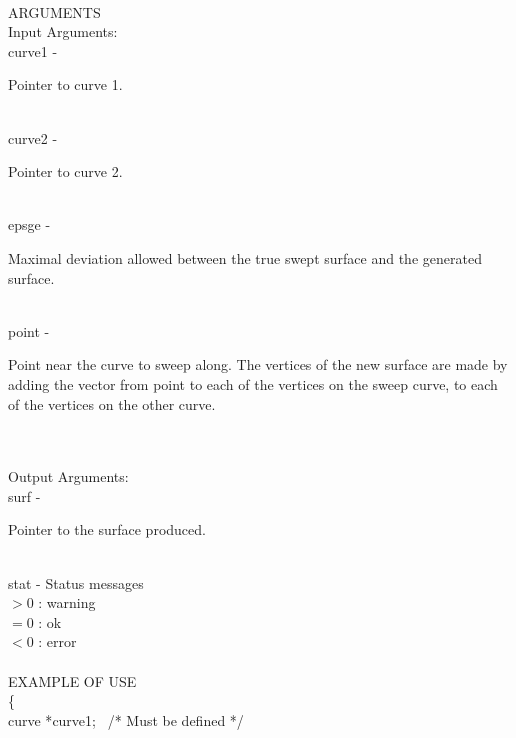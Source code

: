 \\
ARGUMENTS\\
        \>Input Arguments:\\
        \>\>    {\fov curve1}   \> - \> \begin{minipg2}
                                Pointer to curve 1.
                                \end{minipg2}\\
        \>\>    {\fov curve2}   \> - \> \begin{minipg2}
                                Pointer to curve 2.
                                \end{minipg2}\\
        \>\>    {\fov epsge}\> - \>     \begin{minipg2}
                                Maximal deviation allowed between the true swept
                                surface and the generated surface.
                                \end{minipg2}\\[0.3ex]
        \>\>    {\fov point}    \> - \> \begin{minipg2}
                Point near the curve to sweep along. The vertices of the new surface are made by adding the vector from point to each of the vertices on the sweep curve, to each of the vertices on the other curve.
                                \end{minipg2} \\[0.8ex]
\\
        \>Output Arguments:\\
        \>\>    {\fov surf}     \> - \> \begin{minipg2}
                                Pointer to the surface produced.
                                \end{minipg2}\\
        \>\>    {\fov stat}     \> - \> Status messages\\
                \>\>\>\>\>              $>0$    : warning\\
                \>\>\>\>\>              $=0$    : ok\\
                \>\>\>\>\>              $<0$    : error\\
\\
EXAMPLE OF USE\\
                \>      \{ \\
                \>\>    curve   \>      *{\fov curve1}; \, /* Must be defined */\\
